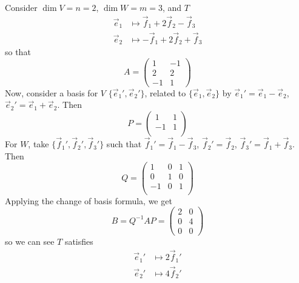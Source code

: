 \documentclass{../../template/note}
\begin{document}
    \begin{example}
        Consider \(\dim V = n = 2\), \(\dim W = m = 3\), and \(T\)
        \begin{align*}
            \vec e_1 &\mapsto \vec f_1 + 2 \vec f_2 - \vec f_3 \\
            \vec e_2 &\mapsto -\vec f_1 + 2 \vec f_2 + \vec f_3
        \end{align*}
        so that
        \[
            A = \begin{pmatrix}
             1 & -1 \\
             2 & 2 \\ 
             -1 & 1
            \end{pmatrix}
        \]
        Now, consider a basis for \(V\) \(\{\vec e_1', \vec e_2'\}\), related to \(\{\vec e_1, \vec e_2\}\) by \(\vec e_1' = \vec e_1 - \vec e_2\), \(\vec e_2' = \vec e_1 + \vec e_2\). Then
        \[
            P = \begin{pmatrix}
             1 & 1 \\
             -1 & 1 \\
            \end{pmatrix}
        \]
        For \(W\), take \(\{\vec f_1', \vec f_2', \vec f_3'\}\) such that \(\vec f_1' = \vec f_1 - \vec f_3\), \(\vec f_2' = \vec f_2\), \(\vec f_3' = \vec f_1 + \vec f_3\). Then
        \[
            Q = \begin{pmatrix}
             1 & 0 & 1 \\
             0 & 1 & 0 \\
             -1 & 0 & 1 \\
            \end{pmatrix}
        \]
        Applying the change of basis formula, we get
        \[
            B = Q^{-1}AP = \begin{pmatrix}
             2 & 0 \\
             0 & 4 \\ 
             0 & 0
            \end{pmatrix}
        \]
        so we can see \(T\) satisfies
        \begin{align*}
            \vec e_1' &\mapsto 2 \vec f_1' \\
            \vec e_2' &\mapsto 4 \vec f_2'
        \end{align*}
    \end{example}
    
\end{document}
